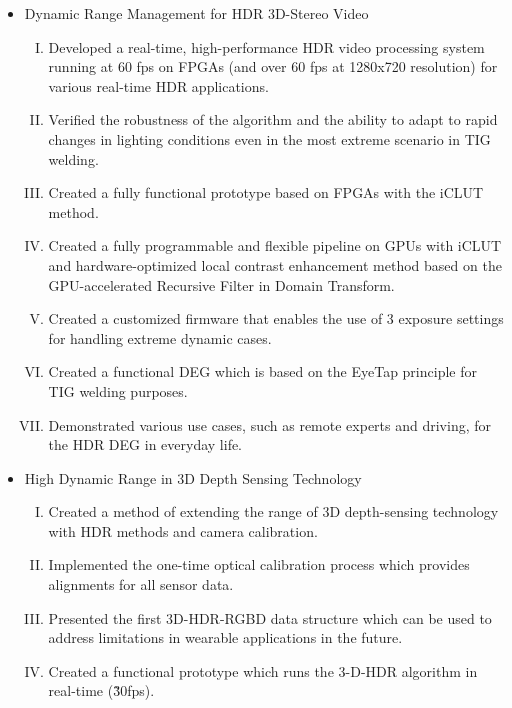 \begin{itemize}
\item Dynamic Range Management for HDR 3D-Stereo Video
\begin{enumerate}[(I)]
\item Developed a real-time, high-performance HDR video processing system running at 60 fps on FPGAs (and over 60 fps at 1280x720 resolution) for various real-time HDR applications.
\item Verified the robustness of the algorithm and the ability to adapt to rapid changes in lighting  conditions even in the most extreme scenario in TIG welding.  
\item Created a fully functional prototype based on FPGAs with the iCLUT method.
\item Created a fully programmable and flexible pipeline on GPUs with iCLUT and hardware-optimized local contrast enhancement method based on the GPU-accelerated Recursive Filter in Domain Transform.
\item Created a customized firmware that enables the use of 3 exposure settings for handling extreme dynamic cases.
\item Created a functional DEG which is based on the EyeTap principle for TIG welding purposes.
\item Demonstrated various use cases, such as remote experts and driving, for the HDR DEG in everyday life.
\end{enumerate}

\item High Dynamic Range in 3D Depth Sensing Technology
\begin{enumerate}[(I)]
\item Created a method of extending the range of 3D depth-sensing technology with HDR methods and camera calibration.
\item Implemented the one-time optical calibration process which provides alignments for all sensor data.
\item Presented the first 3D-HDR-RGBD data structure which can be used to address limitations in wearable applications in the future.
\item Created a functional prototype which runs the 3-D-HDR algorithm in real-time (\~30fps). 
\end{enumerate}


\end{itemize}

